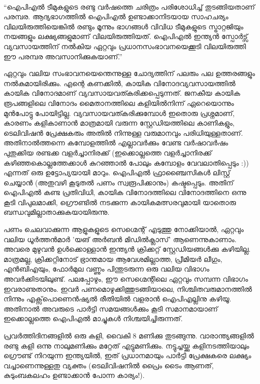 \vskip 2pt

‌\begin{framed}
``ഐപിഎല്‍ ടീമുകളുടെ രണ്ടു വര്‍ഷത്തെ ചരിത്രം പരിശോധിച്ച് തുടങ്ങിയതാണ് പരമ്പര. ആദ്യഭാഗത്തില്‍ ഐപിഎല്‍ 
ഉണ്ടാക്കാനിടയായ സാഹചര്യം വിലയിരുത്തിയെങ്കില്‍ രണ്ടും മൂന്നും ഭാഗങ്ങള്‍ വിവിധ ടീമുകളുടെ സ്ട്രാറ്റജിയും നയങ്ങളും 
ലക്ഷ്യങ്ങളുമാണ് വിലയിരുത്തിയത്. ഐപിഎല്‍ ഇന്ത്യന്‍ സ്പോര്‍ട്സ് വ്യവസായത്തിന് നല്‍കിയ ഏറ്റവും 
പ്രധാനസംഭാവനയെക്കൂടി വിലയിരുത്തി ഈ പരമ്പര അവസാനിക്കുകയാണ്.''
\end{framed}

{\vskip 12pt}

ഏറ്റവും വലിയ സംഭാവനയെന്തെന്നുള്ള ചോദ്യത്തിന് പലരും പല ഉത്തരങ്ങളും നല്‍കുമായിരിക്കും. എന്റെ കണക്കില്‍, 
കായിക വിനോദവ്യവസായത്തില്‍ കായിക വിനോദമാണ് വ്യവസായവത്കരിക്കപ്പെടുന്നത്. ജനകീയ കായിക രൂപങ്ങളിലെ 
വിനോദം മൈതാനത്തിലെ കളിയില്‍നിന്ന് ഏറെയൊന്നും മുന്‍പോട്ടു പോയിട്ടില്ല. വ്യവസായവത്കരിക്കുമ്പോള്‍ ഇതൊരു 
പ്രശ്നമാണ്, കാരണം കളികാണാന്‍ മാത്രമായി വരുന്ന സ്റ്റേഡിയത്തിലെ കാണികളും, ടെലിവിഷന്‍ പ്രേക്ഷകരും അതില്‍ 
നിന്നുള്ള വരുമാനവും പരിധിയുള്ളതാണ്. അതിനാല്‍ത്തന്നെ കമ്പോളത്തില്‍ എല്ലാവര്‍ക്കും വേണ്ട വര്‍ഷാവര്‍ഷം പുതുക്കിയ 
രണ്ടക്ക വളര്‍ച്ചാനിരക്ക് (ഇക്കൊല്ലത്തെ വളര്‍ച്ചാനിരക്ക് കഴിഞ്ഞകൊല്ലത്തേക്കാള്‍ കുറഞ്ഞാല്‍ പോലും കമ്പോളം 
വേവലാതിപ്പെടും :)) എന്നത് ഒരു ഉട്ടോപ്യയായി മാറും. ഐപിഎല്‍ ഫ്രാഞ്ചൈസികള്‍ ലിസ്റ്റ് ചെയ്യാന്‍ (അതുവഴി കൂടുതല്‍ 
പണം സ്വരൂപിക്കാനും) കഷ്ടപ്പെടും. അതിന് ഐപിഎല്‍ കണ്ട പ്രതിവിധി, കായിക വിനോദത്തിലെ വിനോദത്തിനെ ഒന്നു 
കൂടി വിപുലമാക്കി, ഗ്രൌണ്ടില്‍ നടക്കുന്ന കായികമത്സരവുമായി യാതൊരു ബന്ധവുമില്ലാതാക്കുകയായിരുന്നു.

പണം ചെലവാക്കുന്ന ആളുകളുടെ സെഗ്മെന്റ് എടുത്തു നോക്കിയാല്‍, ഏറ്റവും വലിയ ധൂര്‍ത്തന്‍മാര്‍ 'യങ് അര്‍ബന്‍ 
മിഡില്‍ക്ലാസ്' ആണെന്നുകാണാം. അവരെ മുഴുവന്‍ ഉള്‍ക്കൊള്ളാന്‍ ഇന്ത്യന്‍ ക്രിക്കറ്റ് സ്റ്റേഡിയങ്ങള്‍ക്കു കഴിയില്ല. മാത്രമല്ല, 
ക്രിക്കറ്റിനോട് ഭ്രാന്തമായ ആവേശമില്ലാത്ത, പ്രീമിയര്‍ ലീഗും, എന്‍ബിഎയും, ഫോര്‍മുല വണ്ണും പിന്തുടരുന്ന ഒരു വലിയ വിഭാഗം 
അവര്‍ക്കിടയിലുണ്ട്. പലപ്പോഴും, ഈ സെഗ്മെന്റിലെ ഏറ്റവും സമ്പന്ന വിഭാഗം ഇവരാണുതാനും. ഇവര്‍ 
പണമൊഴുക്കിത്തുടങ്ങിയാലെ, നിശ്ചിതവരുമാനത്തില്‍ നിന്നും എക്സ്‌പൊണെന്‍ഷ്യല്‍ രീതിയില്‍ വളരാന്‍ ഐപിഎല്ലിനു 
കഴിയൂ. അതിനാല്‍ അവരുടെ പാര്‍ട്ടി സമയങ്ങള്‍ക്കും കൂടി സമാനമായാണ് ഇക്കൊല്ലത്തെ ഐപിഎല്‍ മാച്ചുകള്‍ 
നിശ്ചയിച്ചിരുന്നത്.


പ്രവര്‍ത്തിദിനങ്ങളില്‍ ഒരു കളി, വൈകി 8 മണിക്കു തുടങ്ങുന്നു. വാരാന്ത്യങ്ങളില്‍ രണ്ടു കളി ഒന്നു നാലുമണിക്കും മറ്റേത് 
എട്ടുമണിക്കും. നട്ടുച്ചയ്ക്കു കളിനടത്തിയാലും ഗ്രൌണ്ട് നിറയുന്ന ഇന്ത്യയില്‍, ഇത് പ്രധാനമായും പാര്‍ട്ടി പ്രേക്ഷകരെ ലക്ഷ്യം 
വച്ചാണെന്നുള്ളതു വ്യക്തം (ടെലിവിഷനില്‍ പ്രൈം ടൈം ആണത്, കുടുംബകലഹം ഉണ്ടാക്കാന്‍ പോന്ന കാര്യം!).

